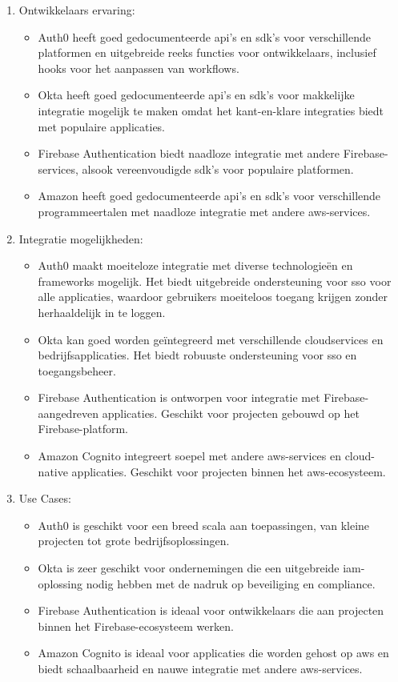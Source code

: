 \begin{enumerate}
  \item Ontwikkelaars ervaring:
  \begin{itemize}
    \item Auth0 heeft goed gedocumenteerde \gls{api}'s en \gls{sdk}'s voor verschillende platformen en uitgebreide reeks functies voor ontwikkelaars, inclusief hooks voor het aanpassen van workflows.
    \item Okta heeft goed gedocumenteerde \gls{api}'s en \gls{sdk}'s voor makkelijke integratie mogelijk te maken omdat het kant-en-klare integraties biedt met populaire applicaties.
    \item Firebase Authentication biedt naadloze integratie met andere Firebase-services, alsook vereenvoudigde \gls{sdk}'s voor populaire platformen.
    \item Amazon heeft goed gedocumenteerde \gls{api}'s en \gls{sdk}'s voor verschillende programmeertalen met naadloze integratie met andere \gls{aws}-services.
  \end{itemize}
  
  \item Integratie mogelijkheden:
  \begin{itemize}
    \item Auth0 maakt moeiteloze integratie met diverse technologieën en frameworks mogelijk. Het biedt uitgebreide ondersteuning voor \gls{sso} voor alle applicaties, waardoor gebruikers moeiteloos toegang krijgen zonder herhaaldelijk in te loggen.
    \item Okta kan goed worden geïntegreerd met verschillende cloudservices en bedrijfsapplicaties. Het biedt robuuste ondersteuning voor \gls{sso} en toegangsbeheer.
    \item Firebase Authentication is ontworpen voor integratie met Firebase-aangedreven applicaties. Geschikt voor projecten gebouwd op het Firebase-platform.
    \item Amazon Cognito integreert soepel met andere \gls{aws}-services en cloud-native applicaties. Geschikt voor projecten binnen het \gls{aws}-ecosysteem.
  \end{itemize}
  
  \item Use Cases:
  \begin{itemize}
    \item Auth0 is geschikt voor een breed scala aan toepassingen, van kleine projecten tot grote bedrijfsoplossingen.
    \item Okta is zeer geschikt voor ondernemingen die een uitgebreide \gls{iam}-oplossing nodig hebben met de nadruk op beveiliging en compliance.
    \item Firebase Authentication is ideaal voor ontwikkelaars die aan projecten binnen het Firebase-ecosysteem werken.
    \item Amazon Cognito is ideaal voor applicaties die worden gehost op \gls{aws} en biedt schaalbaarheid en nauwe integratie met andere \gls{aws}-services.
  \end{itemize}
\end{enumerate}




